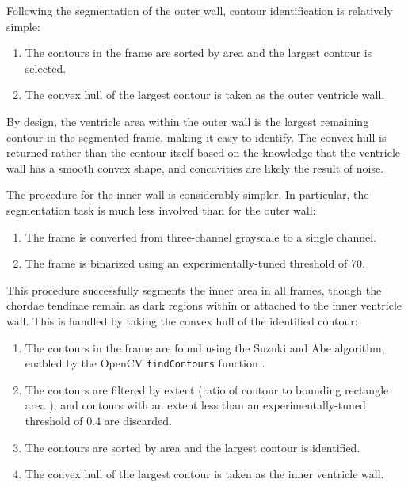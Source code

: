 Following the segmentation of the outer wall, contour identification is relatively simple:

\begin{enumerate}
  \item The contours in the frame are sorted by area and the largest contour is selected.

  \item The convex hull of the largest contour is taken as the outer ventricle wall.

\end{enumerate}

By design, the ventricle area within the outer wall is the largest remaining contour in the segmented frame, making it easy to identify. The convex hull is returned rather than the contour itself based on the knowledge that the ventricle wall has a smooth convex shape, and concavities are likely the result of noise.

The procedure for the inner wall is considerably simpler. In particular, the segmentation task is much less involved than for the outer wall:

\begin{enumerate}
  \item The frame is converted from three-channel grayscale to a single channel.

  \item The frame is binarized using an experimentally-tuned threshold of 70.

\end{enumerate}

This procedure successfully segments the inner area in all frames, though the chordae tendinae remain as dark regions within or attached to the inner ventricle wall. This is handled by taking the convex hull of the identified contour:

\begin{enumerate}
  \item The contours in the frame are found using the Suzuki and Abe \cite{suzuki_1985} algorithm, enabled by the OpenCV \texttt{findContours} function \cite{opencv_2023a}.

  \item The contours are filtered by extent (ratio of contour to bounding rectangle area \cite{opencv_2023b}), and contours with an extent less than an experimentally-tuned threshold of 0.4 are discarded.

  \item The contours are sorted by area and the largest contour is identified.

  \item The convex hull of the largest contour is taken as the inner ventricle wall.

\end{enumerate}

